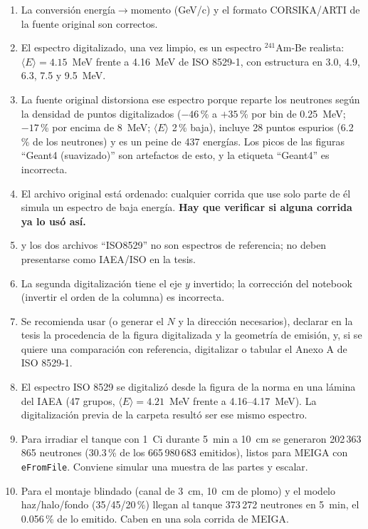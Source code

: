 \documentclass[11pt,a4paper]{article}
\begin{document}
\begin{enumerate}
\item La conversión energía$\to$momento (GeV/c) y el formato CORSIKA/ARTI de la fuente original son correctos.
\item El espectro digitalizado, una vez limpio, es un espectro $^{241}$Am-Be realista: $\langle E\rangle = 4.15$~MeV frente a 4.16~MeV de ISO 8529-1, con estructura en 3.0, 4.9, 6.3, 7.5 y 9.5~MeV.
\item La fuente original distorsiona ese espectro porque reparte los neutrones según la densidad de puntos digitalizados ($-46$\,\% a $+35$\,\% por bin de 0.25~MeV; $-17$\,\% por encima de 8~MeV; $\langle E\rangle$ 2\,\% baja), incluye 28 puntos espurios (6.2\,\% de los neutrones) y es un peine de 437 energías. Los picos de las figuras ``Geant4 (suavizado)'' son artefactos de esto, y la etiqueta ``Geant4'' es incorrecta.
\item El archivo original está ordenado: cualquier corrida que use solo parte de él simula un espectro de baja energía. \textbf{Hay que verificar si alguna corrida ya lo usó así.}
\item {} y los dos archivos ``ISO8529'' no son espectros de referencia; no deben presentarse como IAEA/ISO en la tesis.
\item La segunda digitalización tiene el eje $y$ invertido; la corrección del notebook (invertir el orden de la columna) es incorrecta.
\item Se recomienda usar  (o generar el $N$ y la dirección necesarios), declarar en la tesis la procedencia de la figura digitalizada y la geometría de emisión, y, si se quiere una comparación con referencia, digitalizar o tabular el Anexo A de ISO 8529-1.
\item El espectro ISO 8529 se digitalizó desde la figura de la norma en una lámina del IAEA (47 grupos, $\langle E\rangle=4.21$~MeV frente a 4.16--4.17~MeV). La digitalización previa de la carpeta resultó ser ese mismo espectro.
\item Para irradiar el tanque con 1~Ci durante 5~min a 10~cm se generaron 202\,363\,865 neutrones (30.3\,\% de los 665\,980\,683 emitidos), listos para MEIGA con \texttt{eFromFile}. Conviene simular una muestra de las partes y escalar.
\item Para el montaje blindado (canal de 3~cm, 10~cm de plomo) y el modelo haz/halo/fondo (35/45/20\,\%) llegan al tanque 373\,272 neutrones en 5~min, el 0.056\,\% de lo emitido. Caben en una sola corrida de MEIGA.
\end{enumerate}
\end{document}
